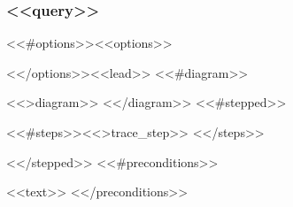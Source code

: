 \subsubsection{\texorpdfstring{<<query>>}{<<queryplain>>}}
\label{atk:<<atkid>>}
<<#options>>\noindent<<options>>\par\smallskip
<</options>>\noindent <<lead>>
<<#diagram>>\par\nopagebreak
<<>diagram>>
<</diagram>>
<<#stepped>>
\begin{vptrace}
<<#steps>><<>trace_step>>
<</steps>>\end{vptrace}
<</stepped>>
<<#preconditions>>

\noindent <<text>>
<</preconditions>>
